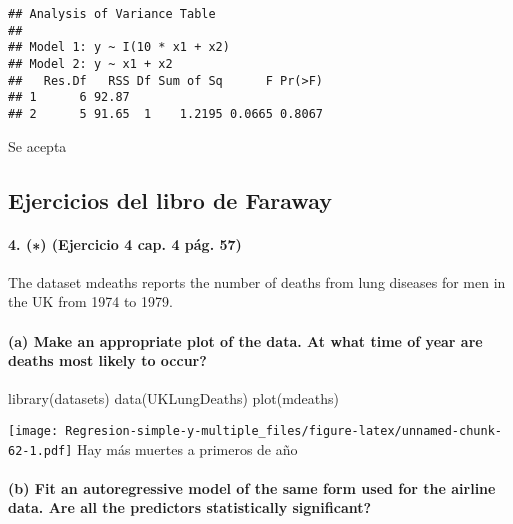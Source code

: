 \documentclass[
]{article}
\newenvironment{Shaded}{\begin{snugshade}}{\end{snugshade}}
\newcommand{\FunctionTok}[1]{\textcolor[rgb]{0.00,0.00,0.00}{#1}}
\newcommand{\NormalTok}[1]{#1}
\begin{document}
\begin{verbatim}
## Analysis of Variance Table
## 
## Model 1: y ~ I(10 * x1 + x2)
## Model 2: y ~ x1 + x2
##   Res.Df   RSS Df Sum of Sq      F Pr(>F)
## 1      6 92.87                           
## 2      5 91.65  1    1.2195 0.0665 0.8067
\end{verbatim}

Se acepta

\hypertarget{ejercicios-del-libro-de-faraway-1}{%
\subsection{Ejercicios del libro de
Faraway}\label{ejercicios-del-libro-de-faraway-1}}

\hypertarget{ejercicio-4-cap.-4-puxe1g.-57}{%
\paragraph{4. (∗) (Ejercicio 4 cap. 4 pág.
57)}\label{ejercicio-4-cap.-4-puxe1g.-57}}

The dataset mdeaths reports the number of deaths from lung diseases for
men in the UK from 1974 to 1979.

\hypertarget{a-make-an-appropriate-plot-of-the-data.-at-what-time-of-year-are-deaths-most-likely-to-occur}{%
\paragraph{(a) Make an appropriate plot of the data. At what time of
year are deaths most likely to
occur?}\label{a-make-an-appropriate-plot-of-the-data.-at-what-time-of-year-are-deaths-most-likely-to-occur}}

\begin{Shaded}
\begin{Highlighting}[]
\FunctionTok{library}\NormalTok{(datasets)}
\FunctionTok{data}\NormalTok{(UKLungDeaths)}
\FunctionTok{plot}\NormalTok{(mdeaths)}
\end{Highlighting}
\end{Shaded}

\texttt{[image: Regresion-simple-y-multiple\_files/figure-latex/unnamed-chunk-62-1.pdf]}
Hay más muertes a primeros de año

\hypertarget{b-fit-an-autoregressive-model-of-the-same-form-used-for-the-airline-data.-are-all-the-predictors-statistically-significant}{%
\paragraph{(b) Fit an autoregressive model of the same form used for the
airline data. Are all the predictors statistically
significant?}\label{b-fit-an-autoregressive-model-of-the-same-form-used-for-the-airline-data.-are-all-the-predictors-statistically-significant}}
\end{document}
